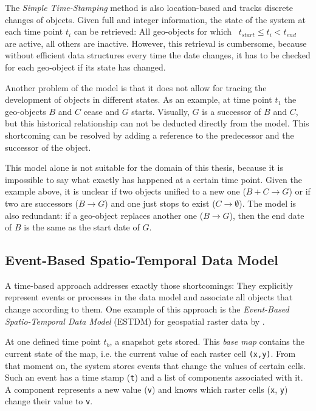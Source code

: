The \emph{Simple Time-Stamping} method is also location-based and tracks discrete changes of objects. Given full and integer information, the state of the system at each time point $t_i$ can be retrieved: All geo-objects for which ~$t_{start} \leq t_i < t_{end}$~ are active, all others are inactive. However, this retrieval is cumbersome, because without efficient data structures every time the date changes, it has to be checked for each geo-object if its state has changed.

Another problem of the model is that it does not allow for tracing the development of objects in different states. As an example, at time point $t_1$ the geo-objects $B$ and $C$ cease and $G$ starts. Visually, $G$ is a successor of $B$ and $C$, but this historical relationship can not be deducted directly from the model. This shortcoming can be resolved by adding a reference to the predecessor and the successor of the object.

This model alone is not suitable for the domain of this thesis, because it is impossible to say what exactly has happened at a certain time point. Given the example above, it is unclear if two objects unified to a new one ($B+C \to G$) or if two are successors ($B \to G$) and one just stops to exist ($C \to \emptyset$). The model is also redundant: if a geo-object replaces another one ($B \to G$), then the end date of $B$ is the same as the start date of $G$.


\subsection{Event-Based Spatio-Temporal Data Model} %
\label{sub:event_based_spatio_temporal_data_model}

A time-based approach addresses exactly those shortcomings: They explicitly represent events or processes in the data model and associate all objects that change according to them. One example of this approach is the \emph{Event-Based Spatio-Temporal Data Model} (ESTDM) for geospatial raster data by
\cite{peuquet95}.

At one defined time point $t_b$, a snapshot gets stored. This \emph{base map} contains the current state of the map, i.e. the current value of each raster cell \texttt{(x,y)}. From that moment on, the system stores events that change the values of certain cells. Such an event has a time stamp (\texttt{t}) and a list of components associated with it. A component represents a new value (\texttt{v}) and knows which raster cells (\texttt{x}, \texttt{y}) change their value to \texttt{v}.

